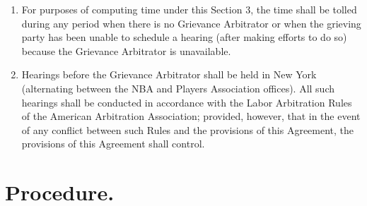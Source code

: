 \documentclass[
]{book}
\begin{document}
\begin{enumerate}
\item
  For purposes of computing time under this Section 3, the time shall be tolled during any period when there is no Grievance Arbitrator or when the grieving party has been unable to schedule a hearing (after making efforts to do so) because the Grievance Arbitrator is unavailable.
\item
  Hearings before the Grievance Arbitrator shall be held in New York (alternating between the NBA and Players Association offices). All such hearings shall be conducted in accordance with the Labor Arbitration Rules of the American Arbitration Association; provided, however, that in the event of any conflict between such Rules and the provisions of this Agreement, the provisions of this Agreement shall control.
\end{enumerate}

\hypertarget{procedure.}{%
\section{Procedure.}\label{procedure.}}
\end{document}

